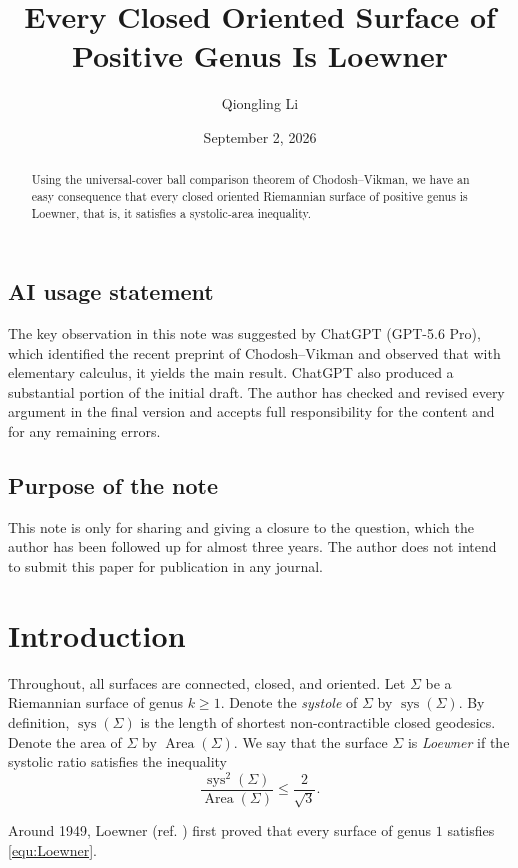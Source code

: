 \documentclass[11pt]{amsart}
\title{Every Closed Oriented Surface of Positive Genus Is Loewner}
\author{Qiongling Li}
\date{September 2, 2026}
\theoremstyle{remark}
\DeclareMathOperator{\Area}{Area}
\DeclareMathOperator{\sys}{sys}
\begin{document}
\maketitle

\begin{abstract}
Using the universal-cover ball comparison theorem of Chodosh--Vikman, we have an easy consequence that every closed oriented Riemannian surface of positive genus is Loewner, that is, it satisfies a systolic-area inequality. 

\end{abstract}
\subsection*{AI usage statement} The key observation in this note was suggested by ChatGPT
(GPT-5.6 Pro), which identified the recent preprint of
Chodosh--Vikman \cite{CV} and observed that with elementary calculus, it yields the main
result. ChatGPT also produced a substantial portion of the initial
draft. The author has checked and revised every argument in the
final version and accepts full responsibility for the content and
for any remaining errors.
\subsection*{Purpose of the note} This note is only for sharing and giving a closure to the question, which the author has been followed up for almost three years. The author does not intend to submit this paper for publication in any journal. 
\section{Introduction}
Throughout, all surfaces are connected, closed, and oriented.  Let $\Sigma$ be a Riemannian surface of genus $k\geq 1$. Denote the \emph{systole} of $\Sigma$ by $\sys(\Sigma)$. By definition, $\sys(\Sigma)$ is the length of shortest non-contractible closed geodesics. Denote the area of $\Sigma$ by 
$\Area(\Sigma)$. We say that the surface $\Sigma$ is \emph{Loewner} if the systolic ratio satisfies the inequality
\begin{equation}\label{equ:Loewner}
    \frac{\sys^2(\Sigma)}{\Area(\Sigma)} \leq \frac{2}{\sqrt{3}}.
\end{equation}

Around 1949, 
Loewner (ref. \cite{Pu}) first proved that every surface of genus $1$ satisfies \eqref{equ:Loewner}. 
\end{document}
